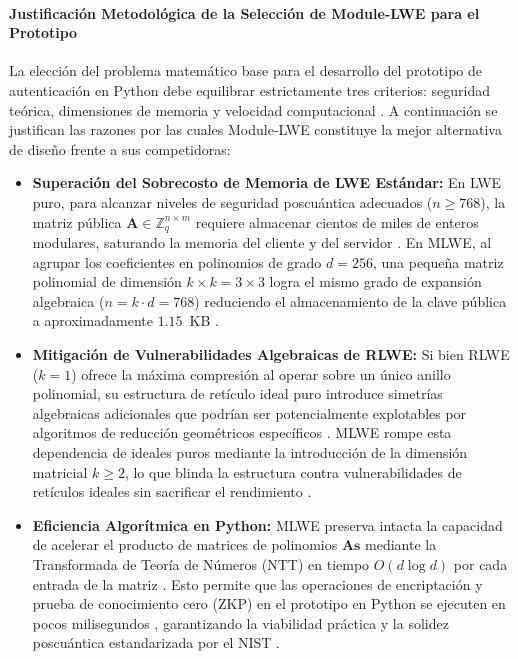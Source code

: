 \paragraph{Justificación Metodológica de la Selección de Module-LWE para el Prototipo}

La elección del problema matemático base para el desarrollo del prototipo de autenticación en Python debe equilibrar estrictamente tres criterios: seguridad teórica, dimensiones de memoria y velocidad computacional \cite{yang2025multiserver, mukil2026implementing, ma2026laasso}. A continuación se justifican las razones por las cuales Module-LWE constituye la mejor alternativa de diseño frente a sus competidoras:

\begin{itemize}
    \item \textbf{Superación del Sobrecosto de Memoria de LWE Estándar:} En LWE puro, para alcanzar niveles de seguridad poscuántica adecuados ($n \ge 768$), la matriz pública $\mathbf{A} \in \mathbb{Z}_q^{n \times m}$ requiere almacenar cientos de miles de enteros modulares, saturando la memoria del cliente y del servidor \cite{yang2025multiserver}. En MLWE, al agrupar los coeficientes en polinomios de grado $d=256$, una pequeña matriz polinomial de dimensión $k \times k = 3 \times 3$ logra el mismo grado de expansión algebraica ($n = k \cdot d = 768$) reduciendo el almacenamiento de la clave pública a aproximadamente $1.15$~KB \cite{yang2025multiserver}.
    
    \item \textbf{Mitigación de Vulnerabilidades Algebraicas de RLWE:} Si bien RLWE ($k=1$) ofrece la máxima compresión al operar sobre un único anillo polinomial, su estructura de retículo ideal puro introduce simetrías algebraicas adicionales que podrían ser potencialmente explotables por algoritmos de reducción geométricos específicos \cite{yang2025multiserver}. MLWE rompe esta dependencia de ideales puros mediante la introducción de la dimensión matricial $k \ge 2$, lo que blinda la estructura contra vulnerabilidades de retículos ideales sin sacrificar el rendimiento \cite{yang2025multiserver, ma2026laasso}.
    
    \item \textbf{Eficiencia Algorítmica en Python:} MLWE preserva intacta la capacidad de acelerar el producto de matrices de polinomios $\mathbf{A}\mathbf{s}$ mediante la Transformada de Teoría de Números (NTT) en tiempo $O(d \log d)$ por cada entrada de la matriz \cite{nguyen2019high, yang2025multiserver}. Esto permite que las operaciones de encriptación y prueba de conocimiento cero (ZKP) en el prototipo en Python se ejecuten en pocos milisegundos \cite{mukil2026implementing, ma2026laasso}, garantizando la viabilidad práctica y la solidez poscuántica estandarizada por el NIST \cite{ma2026laasso}.
\end{itemize}
